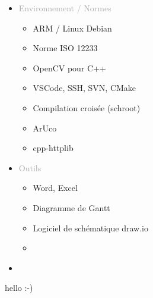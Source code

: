 \documentclass{article}
\begin{document}
\begin{tabular}
\begin{itemize}[label={}, topsep=0pt, partopsep=0pt, itemsep=0.5pt, parsep=2pt]
\begin{itemize}
            \item[\textcolor{white}{\checkmark}] \textcolor{gray!80}{} %
        \end{itemize}
        \item \textcolor{darkGray}{Environnement / Normes} 
        \begin{itemize}
        [label={\textcolor{gray!80}{\checkmark}}, topsep=0pt, partopsep=0pt, itemsep=0.5pt, parsep=2pt] 
            \item \textcolor{gray!80}{ARM / Linux Debian}
            \item \textcolor{gray!80}{Norme ISO 12233}
            \item \textcolor{gray!80}{OpenCV pour C++}
            \item \textcolor{gray!80}{VSCode, SSH, SVN, CMake}
            \item \textcolor{gray!80}{Compilation croisée (schroot)}
            \item \textcolor{gray!80}{ArUco}
            \item \textcolor{gray!80}{cpp-httplib} 
        \end{itemize}
        \item \textcolor{darkGray}{Outils}
        \begin{itemize}
        [label={\textcolor{gray!80}{\checkmark}}, topsep=0pt, partopsep=0pt, itemsep=0.5pt, parsep=2pt] 
            \item \textcolor{gray!80}{Word, Excel}
            \item \textcolor{gray!80}{Diagramme de Gantt}
            \item \textcolor{gray!80}{Logiciel de schématique draw.io}
            \item[\textcolor{white}{\checkmark}] \textcolor{gray!80}{} %
        \end{itemize}
        \item \textcolor{darkGray}{}
    \end{itemize}
\end{tabular}



\newpage
\thispagestyle{pro_experience_linxens}

hello :-)
\end{document}
